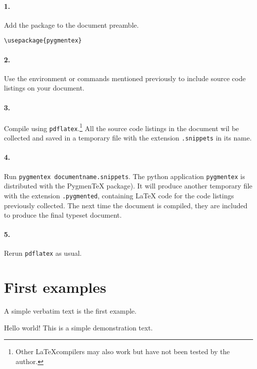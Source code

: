 \documentclass[10pt,a4paper]{article}
\begin{document}
\paragraph{1.} Add the package to the document preamble.
\begin{verbatim}
\usepackage{pygmentex}
\end{verbatim}

\paragraph{2.} Use the environment or commands mentioned previously to include source
code listings on your document.

\paragraph{3.} Compile using \texttt{pdflatex}.\footnote{Other \LaTeX compilers
may also work but have not been tested by the author.}
All the source code listings in the document wil be collected and saved in a
temporary file with the extension \texttt{.snippets} in its name.

\paragraph{4.} Run \texttt{pygmentex documentname.snippets}.
The python application \texttt{pygmentex} is
distributed with the Pygmen\TeX{} package).
It will produce another temporary file with the extension
\texttt{.pygmented}, containing \LaTeX{} code for the code listings
previously collected. The next time the document is compiled, they are
included to produce the final typeset document.

\paragraph{5.} Rerun \texttt{pdflatex} as usual.


\section{First examples}

A simple verbatim text is the first example.

\begin{Example}
\begin{pygmented}[]
Hello world!
  This is a simple demonstration text.
\end{pygmented}
\end{Example}
\end{document}
